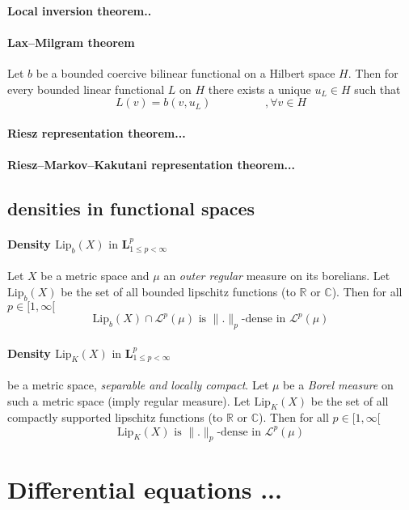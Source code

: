 \documentclass[a4paper,10pt]{article}
\begin{document}
\paragraph{Local inversion theorem..}%

\paragraph{Lax–Milgram theorem} Let $b$ be a bounded coercive bilinear functional on a Hilbert space $H$. Then for every bounded linear functional $L$ on $H$ there exists a unique $u_{L} \in H$ such that 
\[
L(v) = b(v,u_{L}) \hspace{2cm} ,\forall v \in H
\]

\paragraph{Riesz representation theorem...}%
\paragraph{Riesz–Markov–Kakutani representation theorem...}%
\subsection{densities in functional spaces}
\paragraph{Density $\text{Lip}_b(X) \text{ in } \textbf{L}^p_{1 \leq p < \infty}$} Let $X$ be a metric space and $\mu$ an \textit{outer regular} measure on its borelians. Let $\text{Lip}_b(X)$ be the set of all bounded lipschitz functions (to $\mathbb{R} \text{ or } \mathbb{C} $). Then for all $ p \in [1, \infty[ $
\[
\text{Lip}_b(X) \cap \mathcal{L}^p(\mu) \text{ is } \|.\|_p \text{-dense in }  \mathcal{L}^p(\mu)
\]
\paragraph{Density $\text{Lip}_K(X) \text{ in } \textbf{L}^p_{1 \leq p < \infty}$} be a metric space, \textit{separable and locally compact}. Let $\mu$ be a \textit{Borel measure} on such a metric space (imply regular measure). Let $\text{Lip}_{K}(X)$ be the set of all compactly supported lipschitz functions (to $\mathbb{R} \text{ or } \mathbb{C} $). Then for all $ p \in [1, \infty[ $
\[
\text{Lip}_{K}(X) \text{ is } \|.\|_p \text{-dense in }  \mathcal{L}^p(\mu)
\]




\section{Differential equations ...}%
\end{document}
